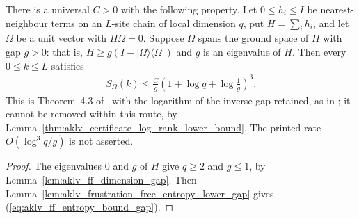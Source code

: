 \begin{theorem}
    \label{thm:aklv_frustration_free_entropy}
    \leanok
    There is a universal $C>0$ with the following property. Let
    $0\le h_i\le I$ be nearest-neighbour terms on an $L$-site chain of
    local dimension $q$, put $H=\sum_i h_i$, and let $\Omega$ be a unit
    vector with $H\Omega=0$. Suppose $\Omega$ spans the ground space of
    $H$ with gap $g>0$: that is, $H\ge g(I-|\Omega\rangle\langle\Omega|)$
    and $g$ is an eigenvalue of $H$. Then every $0\le k\le L$ satisfies
    \begin{align}
        S_\Omega(k)\le\frac Cg
        \left(1+\log q+\log\frac1g\right)^3.
        \label{eq:aklv_ff_entropy_bound_gap}
    \end{align}
    This is Theorem~4.3 of~\cite{Arad2013AreaLaw} with the logarithm of
    the inverse gap retained, as in
    \cite{gap:aklv13_entropy_inverse_gap_logarithm}; it cannot be removed
    within this route, by Lemma~\ref{thm:aklv_certificate_log_rank_lower_bound}.
    The printed rate $O(\log^3q/g)$ is not asserted.
\end{theorem}
\begin{proof}\leanok
    The eigenvalues $0$ and $g$ of $H$ give $q\ge2$ and $g\le1$, by
    Lemma~\ref{lem:aklv_ff_dimension_gap}. Then
    Lemma~\ref{lem:aklv_frustration_free_entropy_lower_gap} gives
    (\ref{eq:aklv_ff_entropy_bound_gap}).
\end{proof}
